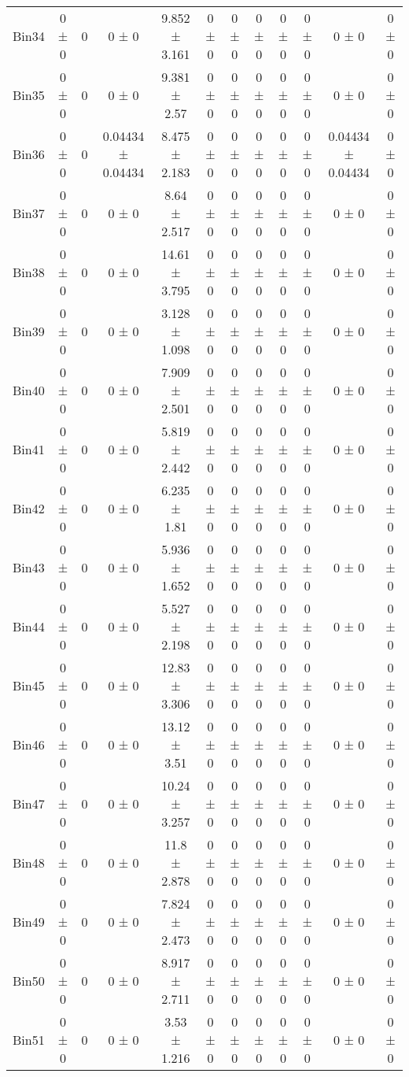 \begin{tabular}{@{\extracolsep{4pt}}lccccccccccc@{}}
     Bin34 & 0 ± 0 & 0 & 0 ± 0 & 9.852 ± 3.161 & 0 ± 0 & 0 ± 0 & 0 ± 0 & 0 ± 0 & 0 ± 0 & 0 ± 0 & 0 ± 0 \\ 
     Bin35 & 0 ± 0 & 0 & 0 ± 0 & 9.381 ± 2.57 & 0 ± 0 & 0 ± 0 & 0 ± 0 & 0 ± 0 & 0 ± 0 & 0 ± 0 & 0 ± 0 \\ 
     Bin36 & 0 ± 0 & 0 & 0.04434 ± 0.04434 & 8.475 ± 2.183 & 0 ± 0 & 0 ± 0 & 0 ± 0 & 0 ± 0 & 0 ± 0 & 0.04434 ± 0.04434 & 0 ± 0 \\ 
     Bin37 & 0 ± 0 & 0 & 0 ± 0 & 8.64 ± 2.517 & 0 ± 0 & 0 ± 0 & 0 ± 0 & 0 ± 0 & 0 ± 0 & 0 ± 0 & 0 ± 0 \\ 
     Bin38 & 0 ± 0 & 0 & 0 ± 0 & 14.61 ± 3.795 & 0 ± 0 & 0 ± 0 & 0 ± 0 & 0 ± 0 & 0 ± 0 & 0 ± 0 & 0 ± 0 \\ 
     Bin39 & 0 ± 0 & 0 & 0 ± 0 & 3.128 ± 1.098 & 0 ± 0 & 0 ± 0 & 0 ± 0 & 0 ± 0 & 0 ± 0 & 0 ± 0 & 0 ± 0 \\ 
     Bin40 & 0 ± 0 & 0 & 0 ± 0 & 7.909 ± 2.501 & 0 ± 0 & 0 ± 0 & 0 ± 0 & 0 ± 0 & 0 ± 0 & 0 ± 0 & 0 ± 0 \\ 
     Bin41 & 0 ± 0 & 0 & 0 ± 0 & 5.819 ± 2.442 & 0 ± 0 & 0 ± 0 & 0 ± 0 & 0 ± 0 & 0 ± 0 & 0 ± 0 & 0 ± 0 \\ 
     Bin42 & 0 ± 0 & 0 & 0 ± 0 & 6.235 ± 1.81 & 0 ± 0 & 0 ± 0 & 0 ± 0 & 0 ± 0 & 0 ± 0 & 0 ± 0 & 0 ± 0 \\ 
     Bin43 & 0 ± 0 & 0 & 0 ± 0 & 5.936 ± 1.652 & 0 ± 0 & 0 ± 0 & 0 ± 0 & 0 ± 0 & 0 ± 0 & 0 ± 0 & 0 ± 0 \\ 
     Bin44 & 0 ± 0 & 0 & 0 ± 0 & 5.527 ± 2.198 & 0 ± 0 & 0 ± 0 & 0 ± 0 & 0 ± 0 & 0 ± 0 & 0 ± 0 & 0 ± 0 \\ 
     Bin45 & 0 ± 0 & 0 & 0 ± 0 & 12.83 ± 3.306 & 0 ± 0 & 0 ± 0 & 0 ± 0 & 0 ± 0 & 0 ± 0 & 0 ± 0 & 0 ± 0 \\ 
     Bin46 & 0 ± 0 & 0 & 0 ± 0 & 13.12 ± 3.51 & 0 ± 0 & 0 ± 0 & 0 ± 0 & 0 ± 0 & 0 ± 0 & 0 ± 0 & 0 ± 0 \\ 
     Bin47 & 0 ± 0 & 0 & 0 ± 0 & 10.24 ± 3.257 & 0 ± 0 & 0 ± 0 & 0 ± 0 & 0 ± 0 & 0 ± 0 & 0 ± 0 & 0 ± 0 \\ 
     Bin48 & 0 ± 0 & 0 & 0 ± 0 & 11.8 ± 2.878 & 0 ± 0 & 0 ± 0 & 0 ± 0 & 0 ± 0 & 0 ± 0 & 0 ± 0 & 0 ± 0 \\ 
     Bin49 & 0 ± 0 & 0 & 0 ± 0 & 7.824 ± 2.473 & 0 ± 0 & 0 ± 0 & 0 ± 0 & 0 ± 0 & 0 ± 0 & 0 ± 0 & 0 ± 0 \\ 
     Bin50 & 0 ± 0 & 0 & 0 ± 0 & 8.917 ± 2.711 & 0 ± 0 & 0 ± 0 & 0 ± 0 & 0 ± 0 & 0 ± 0 & 0 ± 0 & 0 ± 0 \\ 
     Bin51 & 0 ± 0 & 0 & 0 ± 0 & 3.53 ± 1.216 & 0 ± 0 & 0 ± 0 & 0 ± 0 & 0 ± 0 & 0 ± 0 & 0 ± 0 & 0 ± 0 \\ 

\end{tabular}

